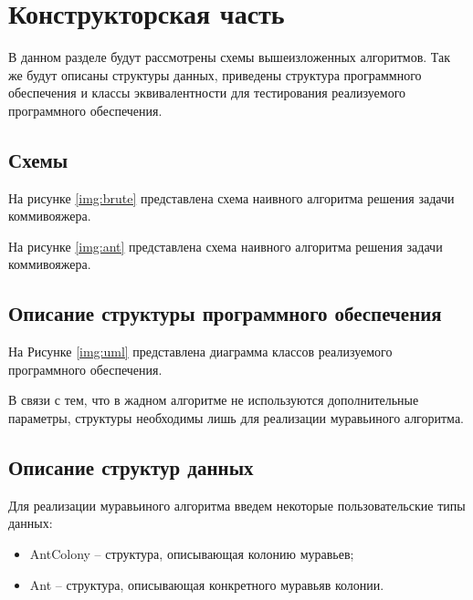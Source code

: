 \chapter{Конструкторская часть}

В данном разделе будут рассмотрены схемы вышеизложенных алгоритмов. Так же будут описаны структуры данных, приведены структура программного обеспечения и классы эквивалентности для тестирования реализуемого программного обеспечения.

\section{Схемы}

На рисунке \ref{img:brute} представлена схема наивного алгоритма решения задачи коммивояжера.

\clearpage

На рисунке \ref{img:ant} представлена схема наивного алгоритма решения задачи коммивояжера.


\section{Описание структуры программного обеспечения}

На Рисунке \ref{img:uml} представлена диаграмма классов реализуемого программного обеспечения.


В связи с тем, что в жадном алгоритме не используются дополнительные параметры, структуры необходимы лишь для реализации муравьиного алгоритма.

\section{Описание структур данных}

Для реализации муравьиного алгоритма введем некоторые пользовательские типы данных:

\begin{itemize}
    \item AntColony -- структура, описывающая колонию муравьев;
    \item Ant -- структура, описывающая конкретного муравьяв колонии.
\end{itemize}

